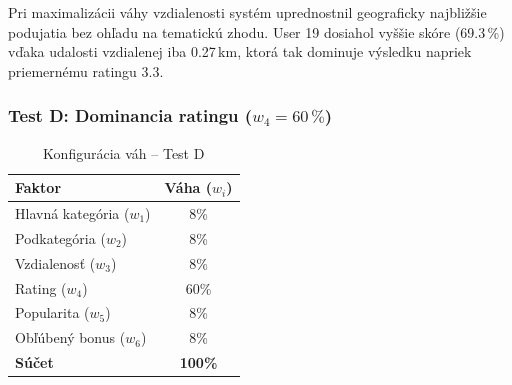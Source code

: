 Pri maximalizácii váhy vzdialenosti systém uprednostnil geograficky najbližšie podujatia bez ohľadu na tematickú zhodu. User 19 dosiahol vyššie skóre (69.3\,\%) vďaka udalosti vzdialenej iba 0.27\,km, ktorá tak dominuje výsledku napriek priemernému ratingu 3.3.

\subsubsection{Test D: Dominancia ratingu ($w_4 = 60\,\%$)}

\begin{table}[H]
\centering
\caption{Konfigurácia váh – Test D}
\label{tab:vahy_testD}
\begin{tabular}{|l|c|}
\hline
\textbf{Faktor} & \textbf{Váha ($w_i$)} \\ \hline
Hlavná kategória ($w_1$) & 8\% \\
Podkategória ($w_2$)     & 8\% \\
Vzdialenosť ($w_3$)      & 8\% \\
Rating ($w_4$)           & 60\% \\
Popularita ($w_5$)       & 8\% \\
Obľúbený bonus ($w_6$)   & 8\% \\ \hline
\textbf{Súčet}           & \textbf{100\%} \\ \hline
\end{tabular}
\end{table}

